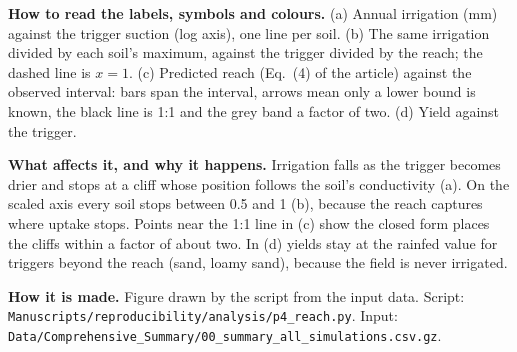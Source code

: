 \textbf{How to read the labels, symbols and colours.} (a) Annual irrigation (mm) against the trigger suction (log axis), one line per soil. (b) The same irrigation divided by each soil's maximum, against the trigger divided by the reach; the dashed line is $x=1$. (c) Predicted reach (Eq.~(4) of the article) against the observed interval: bars span the interval, arrows mean only a lower bound is known, the black line is 1:1 and the grey band a factor of two. (d) Yield against the trigger.

\textbf{What affects it, and why it happens.} Irrigation falls as the trigger becomes drier and stops at a cliff whose position follows the soil's conductivity (a). On the scaled axis every soil stops between 0.5 and 1 (b), because the reach captures where uptake stops. Points near the 1:1 line in (c) show the closed form places the cliffs within a factor of about two. In (d) yields stay at the rainfed value for triggers beyond the reach (sand, loamy sand), because the field is never irrigated.

\textbf{How it is made.} Figure drawn by the script from the input data. Script: \nolinkurl{Manuscripts/reproducibility/analysis/p4_reach.py}. Input: \nolinkurl{Data/Comprehensive_Summary/00_summary_all_simulations.csv.gz}.



